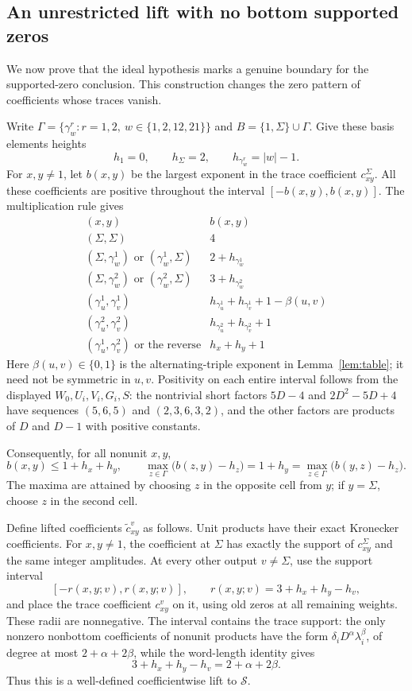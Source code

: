 \subsection{An unrestricted lift with no bottom supported zeros}\label{sec:unrestricted}
We now prove that the ideal hypothesis marks a genuine boundary for the supported-zero conclusion. This construction changes the zero pattern of coefficients whose traces vanish.

Write $\Gamma=\{\gamma_w^r:r=1,2,\ w\in\{1,2,12,21\}\}$ and $B=\{1,\Sigma\}\cup\Gamma$. Give these basis elements heights
\[
 h_1=0,\qquad h_\Sigma=2,\qquad h_{\gamma_w^r}=|w|-1.
\]
For $x,y\ne1$, let $b(x,y)$ be the largest exponent in the trace coefficient $c_{xy}^{\Sigma}$. All these coefficients are positive throughout the interval $[-b(x,y),b(x,y)]$. The multiplication rule gives
\[
\begin{array}{c|c}
(x,y)&b(x,y)\\ \hline
(\Sigma,\Sigma)&4\\
(\Sigma,\gamma_w^1)\text{ or }(\gamma_w^1,\Sigma)&2+h_{\gamma_w^1}\\
(\Sigma,\gamma_w^2)\text{ or }(\gamma_w^2,\Sigma)&3+h_{\gamma_w^2}\\
(\gamma_u^1,\gamma_v^1)&h_{\gamma_u^1}+h_{\gamma_v^1}+1-\beta(u,v)\\
(\gamma_u^2,\gamma_v^2)&h_{\gamma_u^2}+h_{\gamma_v^2}+1\\
(\gamma_u^1,\gamma_v^2)\text{ or the reverse}&h_x+h_y+1
\end{array}
\]
Here $\beta(u,v)\in\{0,1\}$ is the alternating-triple exponent in Lemma~\ref{lem:table}; it need not be symmetric in $u,v$. Positivity on each entire interval follows from the displayed $W_0,U_i,V_i,G_i,S$: the nontrivial short factors $5D-4$ and $2D^2-5D+4$ have sequences $(5,6,5)$ and $(2,3,6,3,2)$, and the other factors are products of $D$ and $D-1$ with positive constants.

Consequently, for all nonunit $x,y$,
\begin{equation}\label{eq:bottom-radii}
 b(x,y)\le1+h_x+h_y,\qquad
 \max_{z\in\Gamma}\bigl(b(z,y)-h_z\bigr)=1+h_y
 =\max_{z\in\Gamma}\bigl(b(y,z)-h_z\bigr).
\end{equation}
The maxima are attained by choosing $z$ in the opposite cell from $y$; if $y=\Sigma$, choose $z$ in the second cell.

Define lifted coefficients $\widetilde c_{xy}^v$ as follows. Unit products have their exact Kronecker coefficients. For $x,y\ne1$, the coefficient at $\Sigma$ has exactly the support of $c_{xy}^{\Sigma}$ and the same integer amplitudes. At every other output $v\ne\Sigma$, use the support interval
\[
 [-r(x,y;v),r(x,y;v)],\qquad
 r(x,y;v)=3+h_x+h_y-h_v,
\]
and place the trace coefficient $c_{xy}^v$ on it, using old zeros at all remaining weights. These radii are nonnegative. The interval contains the trace support: the only nonzero nonbottom coefficients of nonunit products have the form
$\delta_iD^\alpha\lambda_i^\beta$, of degree at most $2+\alpha+2\beta$, while the word-length identity gives
\[
 3+h_x+h_y-h_v=2+\alpha+2\beta.
\]
Thus this is a well-defined coefficientwise lift to $\mathcal S$.

